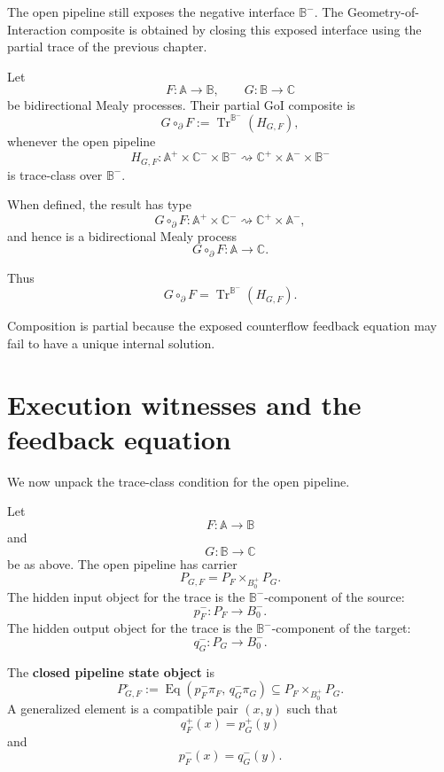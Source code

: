 The open pipeline still exposes the negative interface \(\mathbb B^-\).  The
Geometry-of-Interaction composite is obtained by closing this exposed
interface using the partial trace of the previous chapter.

\begin{definition}
\label{def:partial-goi-composition}
Let
\[
F:\mathbb A\to\mathbb B,
\qquad
G:\mathbb B\to\mathbb C
\]
be bidirectional Mealy processes.  Their partial GoI composite is
\[
G\circ_{\partial}F
:=
\operatorname{Tr}^{\mathbb B^-}(H_{G,F}),
\]
whenever the open pipeline
\[
H_{G,F}:
\mathbb A^+\times\mathbb C^-\times\mathbb B^-
\rightsquigarrow
\mathbb C^+\times\mathbb A^-\times\mathbb B^-
\]
is trace-class over \(\mathbb B^-\).
\end{definition}

When defined, the result has type
\[
G\circ_{\partial}F:
\mathbb A^+\times\mathbb C^-
\rightsquigarrow
\mathbb C^+\times\mathbb A^-,
\]
and hence is a bidirectional Mealy process
\[
G\circ_{\partial}F:\mathbb A\to\mathbb C.
\]

Thus
\[
\boxed{
G\circ_{\partial}F
=
\operatorname{Tr}^{\mathbb B^-}(H_{G,F}).
}
\]

Composition is partial because the exposed counterflow feedback equation may
fail to have a unique internal solution.

\section{Execution witnesses and the feedback equation}
\label{sec:execution-witnesses-feedback-equation}

We now unpack the trace-class condition for the open pipeline.

Let
\[
F:\mathbb A\to\mathbb B
\]
and
\[
G:\mathbb B\to\mathbb C
\]
be as above.  The open pipeline has carrier
\[
P_{G,F}=P_F\times_{B_0^+}P_G.
\]
The hidden input object for the trace is the \(\mathbb B^-\)-component of the
source:
\[
p_F^-:P_F\to B_0^-.
\]
The hidden output object for the trace is the \(\mathbb B^-\)-component of the
target:
\[
q_G^-:P_G\to B_0^-.
\]

\begin{definition}
\label{def:closed-pipeline-state-object}
The \textbf{closed pipeline state object} is
\[
P_{G,F}^{\circ}
:=
\operatorname{Eq}
\left(
p_F^-\pi_F,\,
q_G^-\pi_G
\right)
\subseteq
P_F\times_{B_0^+}P_G.
\]
A generalized element is a compatible pair \((x,y)\) such that
\[
q_F^+(x)=p_G^+(y)
\]
and
\[
p_F^-(x)=q_G^-(y).
\]
\end{definition}

